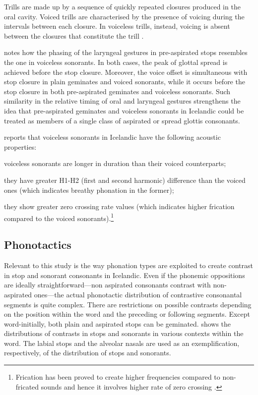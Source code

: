 \documentclass[11pt,a4paper,openany]{memoir}\usepackage[]{graphicx}\usepackage[]{color}
\begin{document}
Trills are made up by a sequence of quickly repeated closures produced in the oral cavity.
Voiced trills are characterised by the presence of voicing during the intervals between each closure.
In voiceless trills, instead, voicing is absent between the closures that constitute the trill \citep[236]{ladefoged1996}.

\citet{helgason2002} notes how the phasing of the laryngeal gestures in pre-aspirated stops resembles the one in voiceless sonorants.
In both cases, the peak of glottal spread is achieved before the stop closure.
Moreover, the voice offset is simultaneous with stop closure in plain geminates and voiced sonorants, while it occurs before the stop closure in both pre-aspirated geminates and voiceless sonorants.
Such similarity in the relative timing of oral and laryngeal gestures strengthens the idea that pre-aspirated geminates and voiceless sonorants in Icelandic could be treated as members of a single class of aspirated or spread glottis consonants.

\citet{bombien2006} reports that voiceless sonorants in Icelandic have the following acoustic properties: 
\begin{inparaenum}[(i)]
\item voiceless sonorants are longer in duration than their voiced counterparts;
\item they have greater H1-H2 (first and second harmonic) difference than the voiced ones (which indicates breathy phonation in the former);
\item they show greater zero crossing rate values (which indicates higher frication compared to the voiced sonorants).\footnote{Frication has been proved to create higher frequencies compared to non-fricated sounds and hence it involves higher rate of zero crossing \citep{weigelt1990}.}
\end{inparaenum}

\subsection{Phonotactics}

Relevant to this study is the way phonation types are exploited to create contrast in stop and sonorant consonants in Icelandic.
Even if the phonemic oppositions are ideally straightforward---non aspirated consonants contrast with non-aspirated ones---the actual phonotactic distribution of contrastive consonantal segments is quite complex.
There are restrictions on possible contrasts depending on the position within the word and the preceding or following segments. Except word-initially, both plain and aspirated stops can be geminated.
 shows the distributions of contrasts in stops and sonorants in various contexts within the word.
The labial stops and the alveolar nasals are used as an exemplification, respectively, of the distribution of stops and sonorants.
\end{document}
